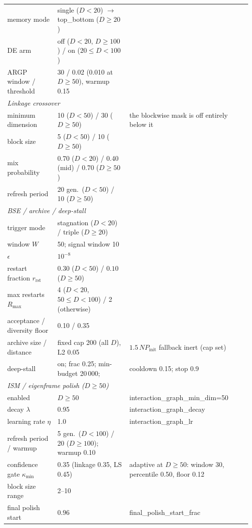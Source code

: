 \begin{table}[H]
\begin{tabular}{p{2.9cm} p{5.8cm} p{4.8cm}}
memory mode & single ($D{<}20$) $\to$ top\_bottom ($D\ge20$) & \\
DE arm & off ($D{<}20$, $D\ge100$) / on ($20{\le}D{<}100$) & \\
ARGP window / threshold & 30 / 0.02 (0.010 at $D\ge50$), warmup 0.15 & \\
\midrule
\multicolumn{3}{l}{\emph{Linkage crossover}}\\
\midrule
minimum dimension & 10 ($D{<}50$) / 30 ($D\ge50$) & the blockwise mask is off entirely below it\\
block size & 5 ($D{<}50$) / 10 ($D\ge50$) & \\
mix probability & 0.70 ($D{<}20$) / 0.40 (mid) / 0.70 ($D\ge50$) & \\
refresh period & 20 gen.\ ($D{<}50$) / 10 ($D\ge50$) & \\
\midrule
\multicolumn{3}{l}{\emph{BSE / archive / deep-stall}}\\
\midrule
trigger mode & stagnation ($D{<}20$) / triple ($D\ge20$) & \\
window $W$ & 50; signal window 10 & \\
$\epsilon$ & $10^{-8}$ & \\
restart fraction $r_{\text{rst}}$ & $0.30$ ($D{<}50$) / $0.10$ ($D\ge50$) & \\
max restarts $R_{\max}$ & 4 ($D{<}20$, $50{\le}D{<}100$) / 2 (otherwise) & \\
acceptance / diversity floor & 0.10 / 0.35 & \\
archive size / distance & fixed cap 200 (all $D$), L2 0.05 & $1.5\,NP_{\text{init}}$ fallback inert (cap set)\\
deep-stall & on; frac 0.25; min-budget 20\,000; & cooldown 0.15; stop 0.9\\
\midrule
\multicolumn{3}{l}{\emph{ISM / eigenframe polish ($D\ge50$)}}\\
\midrule
enabled & $D\ge50$ & interaction\_graph\_min\_dim=50\\
decay $\lambda$ & 0.95 & interaction\_graph\_decay\\
learning rate $\eta$ & 1.0 & interaction\_graph\_lr\\
refresh period / warmup & 5 gen.\ ($D{<}100$) / 20 ($D\ge100$); warmup 0.10 & \\
confidence gate $\kappa_{\min}$ & 0.35 (linkage 0.35, LS 0.45) & adaptive at $D\ge50$: window 30, percentile 0.50, floor 0.12\\
block size range & 2--10 & \\
final polish start & $0.96$ & final\_polish\_start\_frac\\

\end{tabular}
\end{table}
